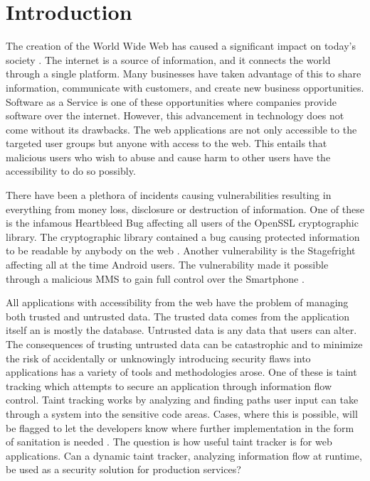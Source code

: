 \chapter{Introduction}
\label{Introduction}
The creation of the World Wide Web has caused a significant impact on today's society \parencite{www}. The internet is a source of information, and it connects the world through a single platform. Many businesses have taken advantage of this to share information, communicate with customers, and create new business opportunities. Software as a Service is one of these opportunities where companies provide software over the internet. \parencite{AllenB.2012SAaS, xaas, NewcombeLee2012SaSa} However, this advancement in technology does not come without its drawbacks. The web applications are not only accessible to the targeted user groups but anyone with access to the web. This entails that malicious users who wish to abuse and cause harm to other users have the accessibility to do so possibly. 

There have been a plethora of incidents causing vulnerabilities resulting in everything from money loss, disclosure or destruction of information. One of these is the infamous Heartbleed Bug affecting all users of the OpenSSL cryptographic library. The cryptographic library contained a bug causing protected information to be readable by anybody on the web \parencite{Heartbleed}. Another vulnerability is the Stagefright affecting all at the time Android users. The vulnerability made it possible through a malicious MMS to gain full control over the Smartphone \parencite{2015ASvt}. 

All applications with accessibility from the web have the problem of managing both trusted and untrusted data. The trusted data comes from the application itself an is mostly the database. Untrusted data is any data that users can alter. The consequences of trusting untrusted data can be catastrophic and to minimize the risk of accidentally or unknowingly introducing security flaws into applications has a variety of tools and methodologies arose. One of these is taint tracking which attempts to secure an application through information flow control. Taint tracking works by analyzing and finding paths user input can take through a system into the sensitive code areas. Cases, where this is possible, will be flagged to let the developers know where further implementation in the form of sanitation is needed \parencite{Pan2015, Venkataramani2008}. The question is how useful taint tracker is for web applications. Can a dynamic taint tracker, analyzing information flow at runtime, be used as a security solution for production services?


